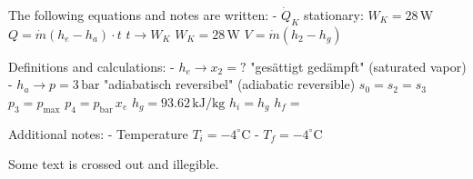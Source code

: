The following equations and notes are written:  
- \( \dot{Q}_K \) stationary:  
  \( W_K = 28 \, \text{W} \)  
  \( Q = \dot{m}(h_e - h_a) \cdot t \)  
  \( t \rightarrow W_K \)  
  \( W_K = 28 \, \text{W} \)  
  \( V = \dot{m}(h_2 - h_g) \)  

Definitions and calculations:  
- \( h_e \rightarrow x_2 = ? \)  
  "gesättigt gedämpft" (saturated vapor)  
- \( h_a \rightarrow p = 3 \, \text{bar} \)  
  "adiabatisch reversibel" (adiabatic reversible)  
  \( s_0 = s_2 = s_3 \)  
  \( p_3 = p_{\text{max}} \)  
  \( p_4 = p_{\text{bar}} \, x_e \)  
  \( h_g = 93.62 \, \text{kJ/kg} \)  
  \( h_i = h_g \)  
  \( h_f = \)  

Additional notes:  
- Temperature \( T_i = -4^\circ \text{C} \)  
- \( T_f = -4^\circ \text{C} \)  

Some text is crossed out and illegible.